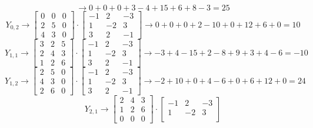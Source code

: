 \documentclass{article}
\begin{document}
{\begin{equation}
    \rightarrow 0+0+0+3-4+15+6+8-3=25
\end{equation}
\begin{equation}
    Y_{0,2} \rightarrow
    \begin{bmatrix}
        0&0&0\\
        2&5&0\\
        4&3&0
    \end{bmatrix}
    \cdot 
    \begin{bmatrix}
        -1&2&-3\\
        1&-2&3\\
        3&2&-1
    \end{bmatrix}
    \rightarrow 0+0+0+2-10+0+12+6+0=10
\end{equation}
\begin{equation}
    Y_{1,1} \rightarrow
    \begin{bmatrix}
        3&2&5\\
        2&4&3\\
        1&2&6
    \end{bmatrix}
    \cdot 
    \begin{bmatrix}
        -1&2&-3\\
        1&-2&3\\
        3&2&-1
    \end{bmatrix}
    \rightarrow -3+4-15+2-8+9+3+4-6=-10
\end{equation}
\begin{equation}
    Y_{1,2} \rightarrow
    \begin{bmatrix}
        2&5&0\\
        4&3&0\\
        2&6&0
    \end{bmatrix}
    \cdot 
    \begin{bmatrix}
        -1&2&-3\\
        1&-2&3\\
        3&2&-1
    \end{bmatrix}
    \rightarrow -2+10+0+4-6+0+6+12+0=24
\end{equation}
\begin{equation}
    Y_{2,1} \rightarrow
    \begin{bmatrix}
        2&4&3\\
        1&2&6\\
        0&0&0
    \end{bmatrix}
    \cdot 
    \begin{bmatrix}
        -1&2&-3\\
        1&-2&3\\

\end{bmatrix}
\end{equation}}
\end{document}
